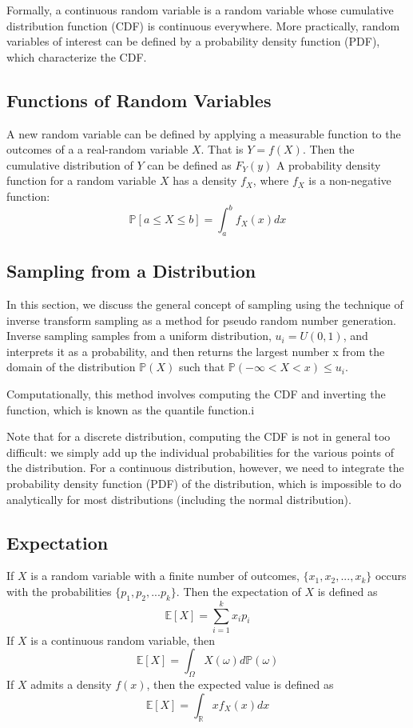 Formally, a continuous random variable is a random variable whose cumulative distribution function (CDF) is continuous everywhere\cite{bertsekas2002_probabilitytheory}.  More practically, random variables of interest can be defined by a probability density function (PDF), which characterize the CDF.

\subsection{Functions of Random Variables}
A new random variable can be defined by applying a measurable function to the outcomes of a a real-random variable $X$.  That is $Y=f(X)$.  Then the cumulative distribution of $Y$ can be defined as $F_Y(y)$
A probability density function for a random variable $X$ has a density $f_X$, where $f_X$ is a non-negative function:
\begin{equation}
  \mathbb{P}[a \leq X \leq b]=\int_{a}^{b}f_{X}(x)dx
\end{equation}


\subsection{Sampling from a Distribution}

In this section, we discuss the general concept of sampling using the technique of inverse transform sampling as a method for pseudo random number generation.  Inverse sampling samples from a uniform distribution, $u_i=U(0,1)$, and interprets it as a probability, and then returns the largest number x from the domain of the distribution $\mathbb{P}(X)$ such that $\mathbb{P}(-\infty<X<x) \leq u_i$.

Computationally, this method involves computing the CDF and inverting the function, which is known as the quantile function.i

Note that for a discrete distribution, computing the CDF is not in general too difficult: we simply add up the individual probabilities for the various points of the distribution.
For a continuous distribution, however, we need to integrate the probability density function (PDF) of the distribution, which is impossible to do analytically for most distributions (including the normal distribution).


\subsection{Expectation}
If $X$ is a random variable with a finite number of outcomes, $\{x_1,x_2,...,x_k\}$ occurs with the probabilities $\{p_1,p_2,...p_k\}$.  Then the expectation of $X$ is defined as
\begin{equation}
  \mathbb{E}[X]=\sum_{i=1}^{k}x_i p_i
\end{equation}
If $X$ is a continuous random variable, then
\begin{equation}
  \mathbb{E}[X]=\int_{\Omega} X(\omega) d\mathbb{P}(\omega)
\end{equation}
If $X$ admits a density $f(x)$, then the expected value is defined as
\begin{equation}
  \mathbb{E}[X]=\int_{\mathbb{R}}x f_{X}(x) dx
\end{equation}

